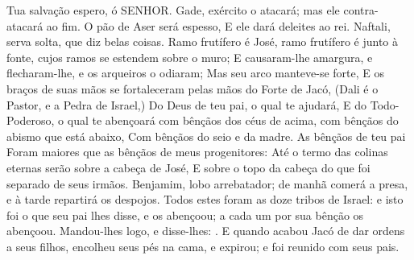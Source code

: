{{{  Tua salvação espero, ó SENHOR.
  Gade, exército o atacará; mas ele contra-atacará ao fim.
  O pão de Aser será espesso, E ele dará deleites ao rei.
  Naftali, serva solta, que diz belas coisas.
  Ramo frutífero é José, ramo frutífero é junto à fonte, cujos ramos se estendem sobre o muro;
  E causaram-lhe amargura, e flecharam-lhe, e os arqueiros o odiaram;
  Mas seu arco manteve-se forte, E os braços de suas mãos se fortaleceram pelas mãos do Forte de Jacó, (Dali é o Pastor, e a Pedra de Israel,)
  Do Deus de teu pai, o qual te ajudará, E do Todo-Poderoso, o qual te abençoará com bênçãos dos céus de acima, com bênçãos do abismo que está abaixo, Com bênçãos do seio e da madre.
  As bênçãos de teu pai Foram maiores que as bênçãos de meus progenitores: Até o termo das colinas eternas serão sobre a cabeça de José, E sobre o topo da cabeça do que foi separado de seus irmãos.
  Benjamim, lobo arrebatador; de manhã comerá a presa, e à tarde repartirá os despojos}.
  Todos estes foram as doze tribos de Israel: e isto foi o que seu pai lhes disse, e os abençoou; a cada um por sua bênção os abençoou.
  Mandou-lhes logo, e disse-lhes: .
  E quando acabou Jacó de dar ordens a seus filhos, encolheu seus pés na cama, e expirou; e foi reunido com seus pais.
\par }

}
